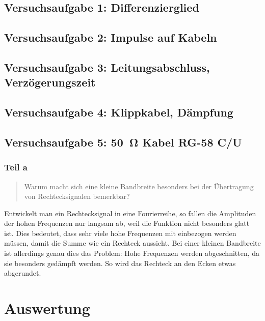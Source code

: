 \subsection{Versuchsaufgabe 1: Differenzierglied}

\subsection{Versuchsaufgabe 2: Impulse auf Kabeln}

\subsection{Versuchsaufgabe 3: Leitungsabschluss, Verzögerungszeit}

\subsection{Versuchsaufgabe 4: Klippkabel, Dämpfung}

\subsection{Versuchsaufgabe 5: \SI{50}{\ohm} Kabel RG-58 C/U}

\subsubsection{Teil a}

\begin{quote}
	Warum macht sich eine kleine Bandbreite besonders bei der Übertragung von
	Rechtecksignalen bemerkbar?
\end{quote}

Entwickelt man ein Rechtecksignal in eine Fourierreihe, so fallen die
Amplituden der hohen Frequenzen nur langsam ab, weil die Funktion nicht
besonders glatt ist. Dies bedeutet, dass sehr viele hohe Frequenzen mit
einbezogen werden müssen, damit die Summe wie ein Rechteck aussieht. Bei einer
kleinen Bandbreite ist allerdings genau dies das Problem: Hohe Frequenzen
werden abgeschnitten, da sie besonders gedämpft werden. So wird das Rechteck an
den Ecken etwas abgerundet.


\section{Auswertung}

